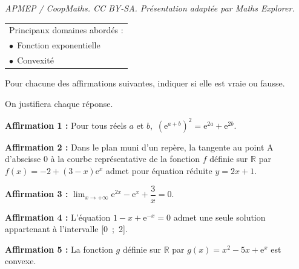 \documentclass[10pt]{article}
\providecommand{\R}{\mathbb{R}}
\begin{document}
\noindent\textit{APMEP / CoopMaths. CC BY-SA. Présentation adaptée par Maths Explorer.}\par\medskip
\smallskip

\begin{tabular}{|l|}\hline
Principaux domaines abordés :\\
\hspace{1.25cm}$\bullet~~$Fonction exponentielle\\
\hspace{1.25cm}$\bullet~~$Convexité\\ \hline
\end{tabular}

\medskip

Pour chacune des affirmations suivantes, indiquer si elle est vraie ou fausse. 

On justifiera chaque réponse. 

\medskip

\textbf{Affirmation 1 :} Pour tous réels $a$ et $b$,\, $\left(\text{e}^{a+b}\right)^2 = \text{e}^{2a} + \text{e}^{2b}$.

\smallskip
\textbf{Affirmation 2 :}  Dans le plan muni d'un repère, la tangente au point A d'abscisse 0 à la courbe représentative de la fonction $f$ définie sur $\R$ par $f(x) = - 2 + (3 - x)\text{e}^x$ admet pour équation réduite $y = 2x + 1$.

\smallskip
\textbf{Affirmation 3 :} $\displaystyle\lim_{x \to + \infty} \text{e}^{2x} - \text{e}^{x} + \dfrac{3}{x}= 0$.

\smallskip
\textbf{Affirmation 4 :} L'équation $1 - x + \text{e}^{-x} = 0$ admet une seule solution appartenant à l'intervalle [0~;~2].

\smallskip
\textbf{Affirmation 5 :} La fonction $g$ définie sur $\R$ par $g(x) = x^2 - 5x + \text{e}^x$ est convexe.

\bigskip
\end{document}
